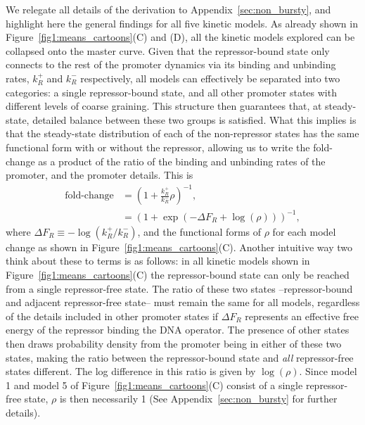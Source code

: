 We relegate all details of the derivation to Appendix~\ref{sec:non_bursty}, and
highlight here the general findings for all five kinetic models. As already
shown in Figure~\ref{fig1:means_cartoons}(C) and (D), all the kinetic models
explored can be collapsed onto the master curve. Given that the repressor-bound
state only connects to the rest of the promoter dynamics via its binding and
unbinding rates, $k_R^+$ and $k_R^-$ respectively, all models can effectively be
separated into two categories: a single repressor-bound state, and all other
promoter states with different levels of coarse graining. This structure then
guarantees that, at steady-state, detailed balance between these two groups is
satisfied. What this implies is that the steady-state distribution of each of
the non-repressor states has the same functional form with or without the
repressor, allowing us to write the fold-change as a product of the ratio of the
binding and unbinding rates of the promoter, and the promoter details. This is
\begin{eqnarray}
\text{fold-change} &= \left( 1 + \frac{k_R^+}{k_R^-} \rho \right)^{-1},\\
&= (1 + \exp(-\Delta F_R + \log(\rho) ))^{-1},
\end{eqnarray}
where $\Delta F_R \equiv -\log(k_R^+/k_R^-)$, and the functional forms of $\rho$
for each model change as shown in Figure~\ref{fig1:means_cartoons}(C). Another
intuitive way two think about these to terms is as follows: in all kinetic
models shown in Figure~\ref{fig1:means_cartoons}(C) the repressor-bound state
can only be reached from a single repressor-free state. The ratio of these two
states --repressor-bound and adjacent repressor-free state-- must remain the
same for all models, regardless of the details included in other promoter states
if $\Delta F_R$ represents an effective free energy of the repressor binding the
DNA operator. The presence of other states then draws probability density from
the promoter being in either of these two states, making the ratio between the
repressor-bound state and \textit{all} repressor-free states different. The log
difference in this ratio is given by $\log(\rho)$. Since model 1 and model 5 of
Figure~\ref{fig1:means_cartoons}(C) consist of a single repressor-free state,
$\rho$ is then necessarily 1 (See Appendix~\ref{sec:non_bursty} for further
details).

